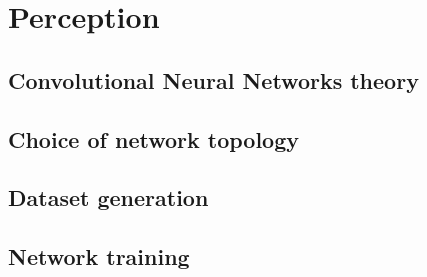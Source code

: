 \chapter{Perception}

\section{Convolutional Neural Networks theory}





\section{Choice of network topology}





\section{Dataset generation}





\section{Network training}





